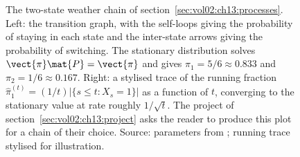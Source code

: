 \begin{figure}[htbp]
\begin{tikzpicture}[
  state/.style={draw=engblack, circle, minimum size=1.2cm,
    align=center, font=\small\bfseries, fill=engblue!12},
  edge/.style={-{Stealth}, thick, draw=engblack!80, font=\scriptsize},
]
\end{tikzpicture}
\caption[The two-state weather Markov chain and its convergence]{The
two-state weather chain of section~\ref{sec:vol02:ch13:processes}.
Left: the transition graph, with the self-loops giving the
probability of staying in each state and the inter-state arrows
giving the probability of switching. The stationary distribution
solves $\vect{\pi}\mat{P} = \vect{\pi}$ and gives
$\pi_{1} = 5/6 \approx 0.833$ and $\pi_{2} = 1/6 \approx 0.167$.
Right: a stylised trace of the running fraction
$\hat\pi_{1}^{(t)} = (1/t) |\{s \leq t : X_{s} = 1\}|$ as a
function of $t$, converging to the stationary value at rate
roughly $1/\sqrt{t}$. The project of section~\ref{sec:vol02:ch13:project}
asks the reader to produce this plot for a chain of their choice.
Source: parameters from \cite[ch.~6]{text:wasserman2004}; running
trace stylised for illustration.}
\label{fig:vol02:ch13:markov-chain}
\end{figure}
